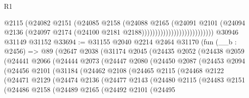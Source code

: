 \begin{lexlean}{R1}
\begin{coremodule}
                                            @2115
                                            (@24082
                                              @2151
                                              (@24085
                                                @2158
                                                (@24088
                                                  @2165
                                                  (@24091
                                                    @2101
                                                    (@24094
                                                      @2136
                                                      (@24097
                                                        @2174
                                                        (@24100
                                                          @2181
                                                          @2188)))))))))))))))))))))))))))
    @30946
    @31149
    @31152
@33694 := @31155
    @2040
    @2214
    @2464
    @31170
    (fun (__b : @2456) =>
    @89
      (@2647
        @2038
        (@31174
          @2045
          (@24435
            @2052
            (@24438
              @2059
              (@24441
                @2066
                (@24444
                  @2073
                  (@24447
                    @2080
                    (@24450
                      @2087
                      (@24453
                        @2094
                        (@24456
                          @2101
                          (@31184
                            (@24462
                              @2108
                              (@24465
                                @2115
                                (@24468
                                  @2122
                                  (@24471
                                    @2129
                                    (@24474
                                      @2136
                                      (@24477
                                        @2143
                                        (@24480
                                          @2115
                                          (@24483
                                            @2151
                                            (@24486
                                              @2158
                                              (@24489
                                                @2165
                                                (@24492
                                                  @2101
                                                  (@24495

\end{coremodule}
\end{lexlean}

